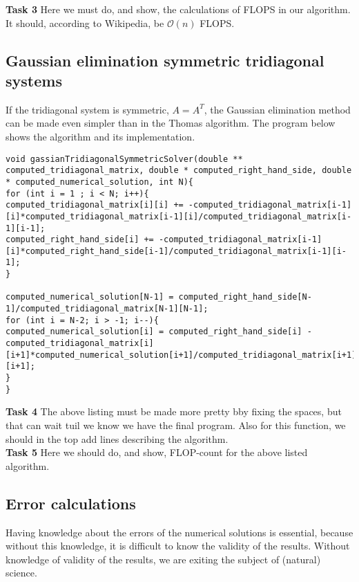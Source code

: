 \documentclass{article}
\begin{document}
\textbf{Task 3} Here we must do, and show, the calculations of FLOPS in our algorithm. It should, according to Wikipedia, be $\mathcal{O}(n)$ FLOPS.

\subsection{Gaussian elimination symmetric tridiagonal systems}
If the tridiagonal system is symmetric, $A = A^T$, the Gaussian elimination method can be made even simpler than in the Thomas algorithm. The program below shows the algorithm and its implementation.

\begin{lstlisting}
void gassianTridiagonalSymmetricSolver(double ** computed_tridiagonal_matrix, double * computed_right_hand_side, double * computed_numerical_solution, int N){
for (int i = 1 ; i < N; i++){
computed_tridiagonal_matrix[i][i] += -computed_tridiagonal_matrix[i-1][i]*computed_tridiagonal_matrix[i-1][i]/computed_tridiagonal_matrix[i-1][i-1];
computed_right_hand_side[i] += -computed_tridiagonal_matrix[i-1][i]*computed_right_hand_side[i-1]/computed_tridiagonal_matrix[i-1][i-1];
}

computed_numerical_solution[N-1] = computed_right_hand_side[N-1]/computed_tridiagonal_matrix[N-1][N-1];
for (int i = N-2; i > -1; i--){
computed_numerical_solution[i] = computed_right_hand_side[i] - computed_tridiagonal_matrix[i][i+1]*computed_numerical_solution[i+1]/computed_tridiagonal_matrix[i+1][i+1];
}
}
\end{lstlisting}

\textbf{Task 4} The above listing must be made more pretty bby fixing the spaces, but that can wait tuil we know we have the final program. Also for this function, we should in the top add lines describing the algorithm.\\

\textbf{Task 5} Here we should do, and show, FLOP-count for the above listed algorithm.

\subsection{Error calculations}
Having knowledge about the errors of the numerical solutions is essential, because without this knowledge, it is difficult to know the validity of the results. Without knowledge of validity of the results, we are exiting the subject of (natural) science. \\
\end{document}
